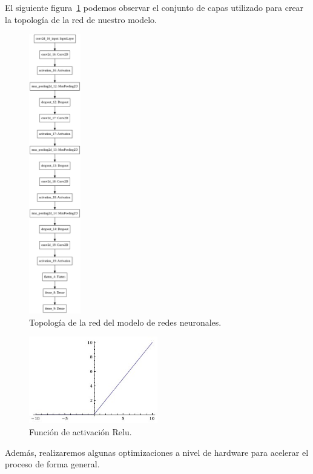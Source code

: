 El siguiente figura~\ref{fig:Topología de la red del modelo de redes neuronales.} podemos observar el conjunto de capas utilizado para crear la topología de la red de nuestro modelo.
\begin{figure}
    \centering
    \includegraphics[width=0.2\textwidth]{images/chapter2/model.png}
    \caption{Topología de la red del modelo de redes neuronales.}
    \label{fig:Topología de la red del modelo de redes neuronales.}
\end{figure}

\begin{figure}
    \centering
    \includegraphics[width=0.5\textwidth]{images/chapter2/relu.jpg}
    \caption{Función de activación Relu.}
    \label{fig:Función de activación Relu}
\end{figure}
Además, realizaremos algunas optimizaciones a nivel de hardware para acelerar el proceso de forma general.

